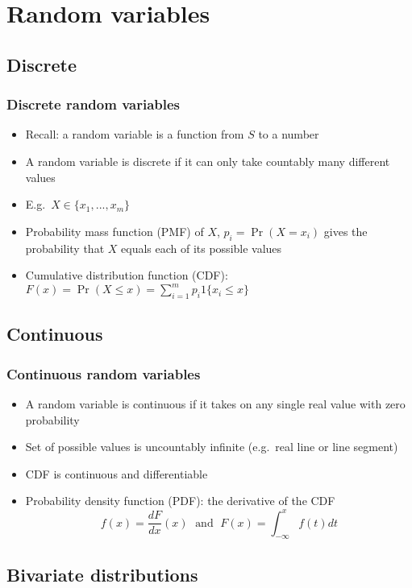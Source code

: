 \section{Random variables}

\subsection{Discrete}

\begin{frame}
  \frametitle{Discrete random variables}
  \begin{itemize}
  \item Recall: a \alert{random variable} is a function from $S$ to a
    number 
  \item A random variable is \alert{discrete} if it can only take
    countably many different values 
  \item E.g.\ $X \in \{x_1, ..., x_m\}$
  \item \alert{Probability mass function (PMF)} of $X$, $p_i = \Pr(X
    = x_i)$ gives the probability that $X$ equals each of its possible
    values 
  \item \alert{Cumulative distribution function (CDF)}: $F(x) = \Pr(X
    \leq x) = \sum_{i=1}^m p_i 1\{x_i \leq x \}$    
  \end{itemize}
\end{frame}

\subsection{Continuous}
\begin{frame} 
  \frametitle{Continuous random variables}
  \begin{itemize}
  \item A random variable is \alert{continuous} if it takes on any
    single real value with zero probability 
  \item Set of possible values is uncountably infinite (e.g.\ real
    line or line segment)
  \item CDF is continuous and differentiable  
  \item \alert{Probability density function (PDF)}: the derivative of
    the CDF
    \[ f(x) = \frac{dF}{dx}(x) \;\text{ and }\; F(x) =
    \int_{-\infty}^x f(t) dt \]
  \end{itemize}
\end{frame}

\subsection{Bivariate distributions}

